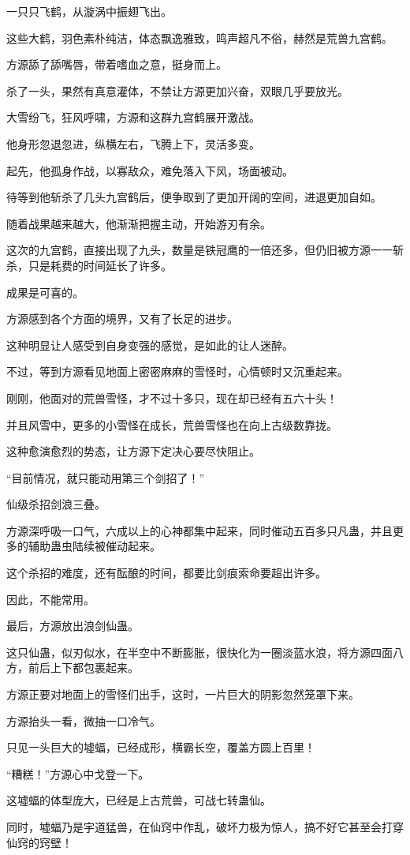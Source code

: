 \begin{this_body}
一只只飞鹤，从漩涡中振翅飞出。

这些大鹤，羽色素朴纯洁，体态飘逸雅致，鸣声超凡不俗，赫然是荒兽九宫鹤。

方源舔了舔嘴唇，带着嗜血之意，挺身而上。

杀了一头，果然有真意灌体，不禁让方源更加兴奋，双眼几乎要放光。

大雪纷飞，狂风呼啸，方源和这群九宫鹤展开激战。

他身形忽退忽进，纵横左右，飞腾上下，灵活多变。

起先，他孤身作战，以寡敌众，难免落入下风，场面被动。

待等到他斩杀了几头九宫鹤后，便争取到了更加开阔的空间，进退更加自如。

随着战果越来越大，他渐渐把握主动，开始游刃有余。

这次的九宫鹤，直接出现了九头，数量是铁冠鹰的一倍还多，但仍旧被方源一一斩杀，只是耗费的时间延长了许多。

成果是可喜的。

方源感到各个方面的境界，又有了长足的进步。

这种明显让人感受到自身变强的感觉，是如此的让人迷醉。

不过，等到方源看见地面上密密麻麻的雪怪时，心情顿时又沉重起来。

刚刚，他面对的荒兽雪怪，才不过十多只，现在却已经有五六十头！

并且风雪中，更多的小雪怪在成长，荒兽雪怪也在向上古级数靠拢。

这种愈演愈烈的势态，让方源下定决心要尽快阻止。

“目前情况，就只能动用第三个剑招了！”

仙级杀招剑浪三叠。

方源深呼吸一口气，六成以上的心神都集中起来，同时催动五百多只凡蛊，并且更多的辅助蛊虫陆续被催动起来。

这个杀招的难度，还有酝酿的时间，都要比剑痕索命要超出许多。

因此，不能常用。

最后，方源放出浪剑仙蛊。

这只仙蛊，似刃似水，在半空中不断膨胀，很快化为一圈淡蓝水浪，将方源四面八方，前后上下都包裹起来。

方源正要对地面上的雪怪们出手，这时，一片巨大的阴影忽然笼罩下来。

方源抬头一看，微抽一口冷气。

只见一头巨大的墟蝠，已经成形，横霸长空，覆盖方圆上百里！

“糟糕！”方源心中戈登一下。

这墟蝠的体型庞大，已经是上古荒兽，可战七转蛊仙。

同时，墟蝠乃是宇道猛兽，在仙窍中作乱，破坏力极为惊人，搞不好它甚至会打穿仙窍的窍壁！

\end{this_body}

